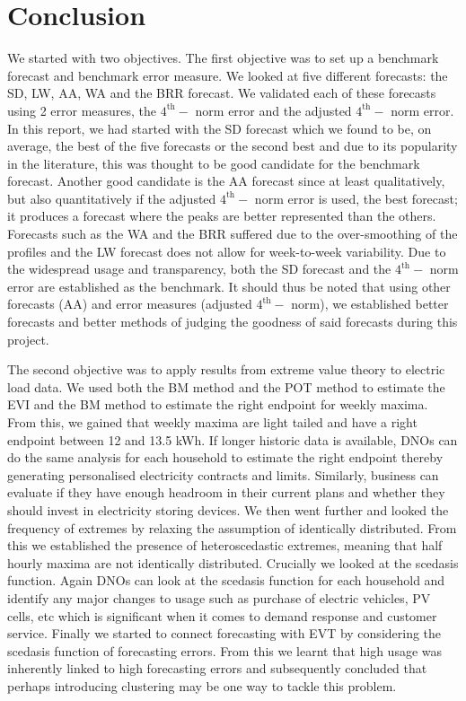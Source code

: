 
\chapter{Conclusion}

We started with two objectives. The first objective was to set up a benchmark forecast and benchmark error measure. We looked at five different forecasts: the SD, LW, AA, WA and the BRR forecast.  We validated each of these forecasts using 2 error measures, the $4^{\text{th}}-$ norm error and the adjusted $4^{\text{th}}-$ norm error. In this report, we had started with the SD forecast which we found to be, on average,  the best of the five forecasts or the second best and due to its popularity in the literature, this was thought to be good candidate for the benchmark forecast. Another good candidate is the AA forecast since at least qualitatively, but also quantitatively if the adjusted $4^{\text{th}}-$ norm error is used, the best forecast; it produces a forecast where the peaks are better represented than the others. Forecasts such as the WA and the BRR suffered due to the over-smoothing of the profiles and the LW forecast does not allow for week-to-week variability. Due to the widespread usage and transparency, both the SD forecast and the $4^{\text{th}}-$ norm error are established as the benchmark. It should thus be noted that using other forecasts (AA) and error measures (adjusted $4^{\text{th}}-$ norm), we established better forecasts and better methods of judging the goodness of said forecasts during this project.

The second objective was to apply results from extreme value theory to electric load data. We used both the BM method and the POT method to estimate the EVI and the BM method to estimate the right endpoint for weekly maxima. From this, we gained that weekly maxima are light tailed and have a right endpoint between 12 and 13.5 kWh. If longer historic data is available, DNOs can do the same analysis for each household to estimate the right endpoint thereby generating personalised electricity contracts and limits. Similarly, business can evaluate if they have enough headroom in their current plans and whether they should invest in electricity storing devices. We then went further and looked the frequency of extremes by relaxing the assumption of identically distributed. From this we established the presence of heteroscedastic extremes, meaning that half hourly maxima are not identically distributed. Crucially we looked at the scedasis function. Again DNOs can look at the scedasis function for each household and identify any major changes to usage such as purchase of electric vehicles, PV cells, etc which is significant when it comes to demand response and customer service. Finally we started to connect forecasting with EVT by considering the scedasis function of forecasting errors. From this we learnt that high usage was inherently linked to high forecasting errors and subsequently concluded that perhaps introducing clustering may be one way to tackle this problem.

